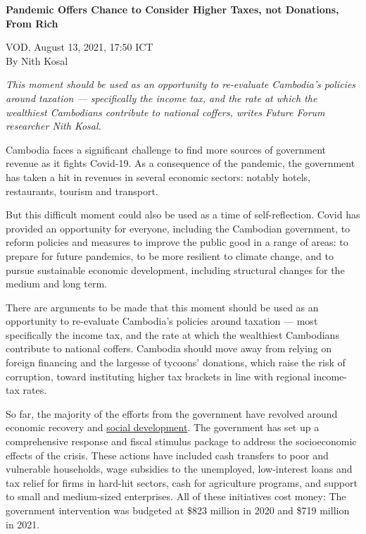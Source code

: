 \documentclass[10pt,a4paper]{letter}
\begin{document}
	
{\Large 
	\textbf{Pandemic Offers Chance to Consider Higher Taxes, not Donations, From Rich}
}

VOD, August 13, 2021, 17:50 ICT\\
By Nith Kosal

\textit{This moment should be used as an opportunity to re-evaluate Cambodia's policies around taxation --- specifically the income tax, and the rate at which the wealthiest Cambodians contribute to national coffers, writes Future Forum researcher Nith Kosal.}

Cambodia faces a significant challenge to find more sources of government revenue as it fights Covid-19. As a consequence of the pandemic, the government has taken a hit in revenues in several economic sectors: notably hotels, restaurants, tourism and transport.

But this difficult moment could also be used as a time of self-reflection. Covid has provided an opportunity for everyone, including the Cambodian government, to reform policies and measures to improve the public good in a range of areas: to prepare for future pandemics, to be more resilient to climate change, and to pursue sustainable economic development, including structural changes for the medium  and long term.

There are arguments to be made that this moment should be used as an opportunity to re-evaluate Cambodia's policies around taxation --- most specifically the income tax, and the rate at which the wealthiest Cambodians contribute to national coffers. Cambodia should move away from relying on foreign financing and the largesse of tycoons' donations, which raise the risk of corruption, toward instituting higher tax brackets in line with regional income-tax rates.


So far, the majority of the efforts from the government have revolved around economic recovery and \href{https://www.phnompenhpost.com/opinion/action-now-can-help-prevent-covid-19-pushing-more-cambodians-poverty}{social development}. The government has set up a comprehensive response and fiscal stimulus package to address the socioeconomic effects of the crisis. These actions have included cash transfers to poor and vulnerable households, wage subsidies to the unemployed, low-interest loans and tax relief for firms in hard-hit sectors, cash for agriculture programs, and support to small and medium-sized enterprises. All of these initiatives cost money: The government intervention was budgeted at \$823 million in 2020 and \$719 million in 2021.
\end{document}
